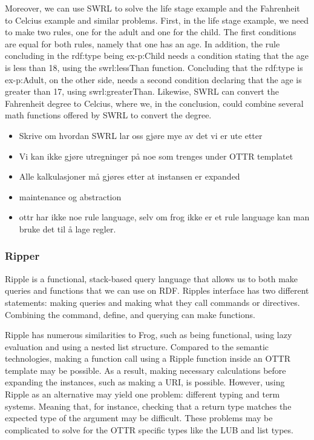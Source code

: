 \para
Moreover, we can use SWRL to solve the life stage example and the Fahrenheit to Celcius example and similar problems. First, in the life stage example, we need to make two rules, one for the adult and one for the child. The first conditions are equal for both rules, namely that one has an age. In addition, the rule concluding in the rdf:type being ex-p:Child needs a condition stating that the age is less than 18, using the swrl:lessThan function. Concluding that the rdf:type is ex-p:Adult, on the other side, needs a second condition declaring that the age is greater than 17, using swrl:greaterThan. Likewise, SWRL can convert the Fahrenheit degree to Celcius, where we, in the conclusion, could combine several math functions offered by SWRL to convert the degree.

\para
\begin{itemize}
    \item Skrive om hvordan SWRL lar oss gjøre mye av det vi er ute etter
    \item Vi kan ikke gjøre utregninger på noe som trenges under OTTR templatet
    \item Alle kalkulasjoner må gjøres etter at instansen er expanded 
    \item maintenance og abstraction
    \item ottr har ikke noe rule language, selv om frog ikke er et rule language kan man bruke det til å lage regler. 
\end{itemize}

\subsubsection{Ripper}
Ripple is a functional, stack-based query language that allows us to both make queries and functions that we can use on RDF. Ripples interface has two different statements: making queries and making what they call commands or directives. Combining the command, define, and querying can make functions.   

\para
Ripple has numerous similarities to Frog, such as being functional, using lazy evaluation and using a nested list structure. Compared to the semantic technologies, making a function call using a Ripple function inside an OTTR template may be possible. As a result, making necessary calculations before expanding the instances, such as making a URI, is possible. However, using Ripple as an alternative may yield one problem: different typing and term systems. Meaning that, for instance, checking that a return type matches the expected type of the argument may be difficult. These problems may be complicated to solve for the OTTR specific types like the LUB and list types.    

